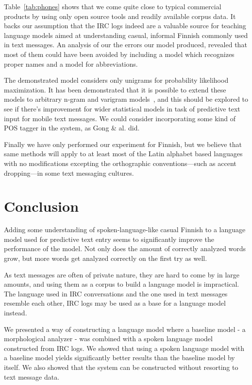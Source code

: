 \documentclass[a4paper,conference]{IEEEtran}
\begin{document}
Table~\ref{tab:phones} shows that we come quite close to typical
commercial products by using only open source tools and readily
available corpus data. It backs our assumption that the IRC logs
indeed are a valuable source for teaching language models aimed at
understanding casual, informal Finnish commonly used in text
messages. An analysis of our the errors our model produced, revealed
that most of them could have been avoided by including a model which
recognizes proper names and a model for abbreviations.

The demonstrated model considers only unigrams for probability
likelihood maximization. It has been demonstrated that it is possible
to extend these models to arbitrary n-gram and varigram
models~\cite{Silfverberg/2011}, and this should be explored to see if
there's improvement for wider statistical models in task of predictive
text input for mobile text messages. We could consider incorporating
some kind of POS tagger in the system, as Gong \& al. \cite{gong/2008}
did.

Finally we have only performed our experiment for Finnish, but we
believe that same methods will apply to at least most of the Latin
alphabet based languages with no modifications excepting the
orthographic conventions---such as accent dropping---in some text messaging
cultures.

\section{Conclusion}
\label{sec:conclusions}
Adding some understanding of spoken-language-like casual Finnish to a
language model used for predictive text entry seems to significantly
improve the performance of the model. Not only does the amount of
correctly analyzed words grow, but more words get analyzed correctly
on the first try as well.

As text messages are often of private nature, they are hard to come by
in large amounts, and using them as a corpus to build a language model
is impractical. The language used in IRC conversations and the one
used in text messages resemble each other, IRC logs may be used as a
base for a language model instead.

We presented a way of constructing a language model where a baseline
model - a morphological analyzer - was combined with a spoken language
model constructed from IRC logs. We showed that using a spoken
language model with a baseline model yields significantly better
results than the baseline model by itself. We also showed that the
system can be constructed without resorting to text message data.
\end{document}

